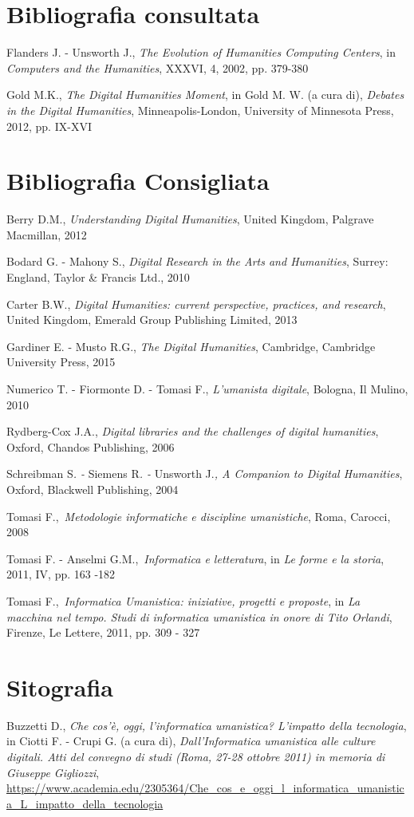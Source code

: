 {\section*{Bibliografia consultata}
{\parindent0pt 
Flanders J. - Unsworth J., \emph{The Evolution of Humanities Computing
Centers}, in \emph{Computers and the Humanities}, XXXVI, 4, 2002, pp.
379-380

Gold M.K., \emph{The Digital Humanities Moment}, in Gold M. W. (a cura
di), \emph{Debates in the Digital Humanities}, Minneapolis-London,
University of Minnesota Press, 2012, pp. IX-XVI
}

\section*{Bibliografia Consigliata}
{\parindent0pt 
Berry D.M., \emph{Understanding Digital Humanities}, United Kingdom,
Palgrave Macmillan, 2012

Bodard G. - Mahony S., \emph{Digital Research in the Arts and
Humanities}, Surrey: England, Taylor \& Francis Ltd., 2010

Carter B.W., \emph{Digital Humanities: current perspective, practices,
and research}, United Kingdom, Emerald Group Publishing Limited, 2013

Gardiner E. - Musto R.G., \emph{The Digital Humanities}, Cambridge,
Cambridge University Press, 2015

Numerico T. - Fiormonte D. - Tomasi F., \emph{L'umanista digitale},
Bologna, Il Mulino, 2010

Rydberg-Cox J.A., \emph{Digital libraries and the challenges of digital
humanities}, Oxford, Chandos Publishing, 2006

Schreibman S\emph{. -} Siemens R\emph{. -} Unsworth J.\emph{, A
Companion to Digital Humanities}, Oxford, Blackwell Publishing, 2004

Tomasi F.,~\emph{Metodologie informatiche e discipline umanistiche},
Roma, Carocci, 2008

Tomasi F. - Anselmi G.M.,~\emph{Informatica e letteratura}, in \emph{Le
forme e la storia}, 2011, IV, pp. 163 -182

Tomasi F.,~\emph{Informatica Umanistica: iniziative, progetti e
proposte}, in \emph{La macchina nel tempo. Studi di informatica
umanistica in onore di Tito Orlandi}, Firenze, Le Lettere, 2011, pp. 309
- 327
}

\section*{Sitografia}
{\parindent0pt 
Buzzetti D., \emph{Che cos'è, oggi, l'informatica umanistica? L'impatto
della tecnologia}, in Ciotti F. - Crupi G. (a cura di),
\emph{Dall'Informatica umanistica alle culture digitali. Atti del
convegno di studi (Roma, 27-28 ottobre 2011) in memoria di Giuseppe
Gigliozzi},
\url{https://www.academia.edu/2305364/Che_cos_e_oggi_l_informatica_umanistica_L_impatto_della_tecnologia}

}}
